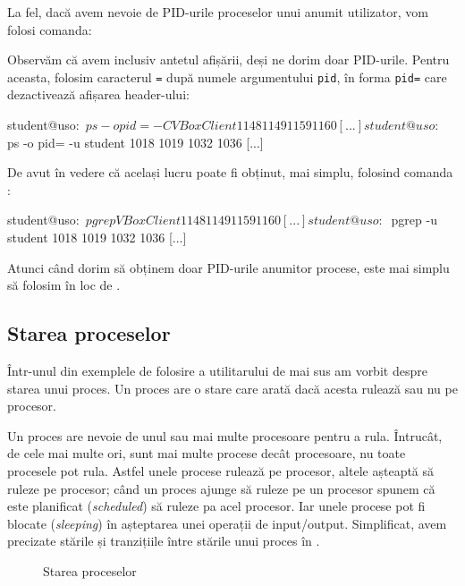 La fel, dacă avem nevoie de PID-urile proceselor unui anumit utilizator, vom
folosi comanda:


Observăm că avem inclusiv antetul afișării, deși ne dorim doar PID-urile. Pentru
aceasta, folosim caracterul \texttt{=} după numele argumentului \texttt{pid}, în forma \texttt{pid=} care
dezactivează afișarea header-ului:

\begin{screen}
student@uso:~$ ps -o pid= -C VBoxClient
 1148
 1149
 1159
 1160
[...]
student@uso:~$ ps -o pid= -u student
 1018
 1019
 1032
 1036
[...]
\end{screen}

De avut în vedere că același lucru poate fi obținut, mai simplu, folosind
comanda :

\begin{screen}
student@uso:~$ pgrep VBoxClient
1148
1149
1159
1160
[...]
student@uso:~$ pgrep -u student
1018
1019
1032
1036
[...]
\end{screen}

Atunci când dorim să obținem doar PID-urile anumitor procese, este mai simplu să
folosim  în loc de .

\subsection{Starea proceselor}
\label{sec:process-resurse-stare}

Într-unul din exemplele de folosire a utilitarului  de mai sus am vorbit
despre starea unui proces. Un proces are o stare care arată dacă acesta rulează
sau nu pe procesor.

Un proces are nevoie de unul sau mai multe procesoare pentru a rula. Întrucât,
de cele mai multe ori, sunt mai multe procese decât procesoare, nu toate
procesele pot rula. Astfel unele procese rulează pe procesor, altele așteaptă să
ruleze pe procesor; când un proces ajunge să ruleze pe un procesor spunem că
este planificat (\textit{scheduled}) să ruleze pa acel procesor. Iar unele
procese pot fi blocate (\textit{sleeping}) în așteptarea unei operații de
input/output. Simplificat, avem precizate stările și tranzițiile între stările unui proces în .

\begin{figure}[!htbp]
	\centering
	\def\svgwidth{0.8\textwidth}
	
	\caption{Starea proceselor}
	\label{fig:process-state}
\end{figure}

